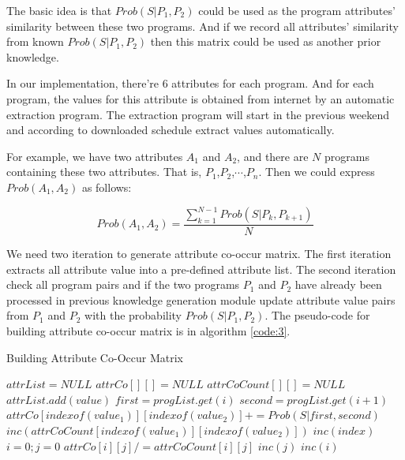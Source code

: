 The basic idea is that $Prob(S|P_1,P_2)$ could be used as the program attributes' similarity between these two programs. And if
we record all attributes' similarity from known $Prob(S|P_1,P_2)$ then this matrix could be used as another prior knowledge.

In our implementation, there're 6 attributes for each program. And for each program, the values for this attribute is obtained
from internet by an automatic extraction program. The extraction program will start in the previous weekend and according to
downloaded schedule extract values automatically.

For example, we have two attributes $A_1$ and $A_2$, and there are $N$ programs containing these two attributes. That is,
$P_1$,$P_2$,$\cdots$,$P_n$. Then we could express $Prob(A_1,A_2)$ as follows:

\begin{equation}
Prob{(A_1,A_2)}=\frac{\sum_{k=1}^{N-1}Prob(S|P_k,P_{k+1})}{N}
\end{equation}

We need two iteration to generate attribute co-occur matrix. The first iteration extracts all attribute value into a pre-defined
attribute list. The second iteration check all program pairs and if the two programs $P_1$ and $P_2$ have already been processed
in previous knowledge generation module update attribute value pairs from $P_1$ and $P_2$ with the probability $Prob(S|P_1,P_2)$.
The pseudo-code for building attribute co-occur matrix is in algorithm \ref{code:3}.

\begin{algorithm}[htb]
\caption{Building Attribute Co-Occur Matrix}
\label{code:3}
\begin{algorithmic}[1]
\STATE $attrList = NULL$
\STATE $attrCo[][] = NULL$
\STATE $attrCoCount[][] = NULL$
\STATE $attrList.add(value)$
\ENDIF
\ENDFOR
\ENDFOR
{}
\STATE $first=progList.get(i)$
\STATE $second = progList.get(i+1)$
\STATE $attrCo[indexof(value_1)][indexof(value_2)] += Prob(S|first,second)$
\STATE $inc(attrCoCount[indexof(value_1)][indexof(value_2)])$
\ENDFOR
\ENDFOR
\STATE $inc(index)$
\ENDWHILE
\STATE $i=0;j=0$
\STATE $attrCo[i][j] /= attrCoCount[i][j]$
\STATE $inc(j)$
\ENDWHILE
\STATE $inc(i)$
\ENDWHILE
\end{algorithmic}
\end{algorithm}

